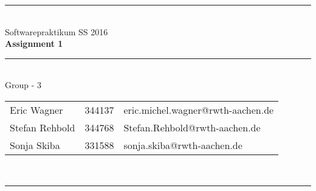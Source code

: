 \documentclass[a4paper,12pt]{article}
\begin{document}
\begin{center}
	\rule{\textwidth}{0.1pt}\\[1cm]
	
	\Large Softwarepraktikum SS 2016\\\bf Assignment 1 
\end{center}


\begin{center}

	\rule{\textwidth}{0.1pt}\\[0.5cm]

	{\Large Group - 3\\[5mm]} 

	\begin{tabular}{lll}
		
		Eric Wagner & 344137 & eric.michel.wagner@rwth-aachen.de \\

		Stefan Rehbold & 344768 & Stefan.Rehbold@rwth-aachen.de \\

		Sonja Skiba & 331588 & sonja.skiba@rwth-aachen.de \\

	\end{tabular}\\[0.5cm]

	\rule{\textwidth}{0.1pt}\\[1cm]

\end{center}






\end{document}
